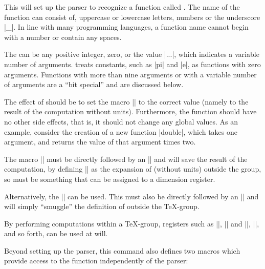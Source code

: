\begin{command}{\pgfmathdeclarefunction{}}

  This will set up the parser to recognize a function called
  . The name of the function can consist of, uppercase or
  lowercase letters, numbers or the underscore |_|. In line with
  many programming languages, a function name cannot begin with a
  number or contain any spaces.

  The  can be any positive integer, zero,
  or the value |...|, which indicates a variable number of
  arguments. \pgfname{} treats constants, such as |pi| and |e|, as
  functions with zero arguments. Functions with more than nine
  arguments or with a variable number of arguments are a ``bit special'' and
  are discussed below.

  The effect of  should be to set the macro
  |\pgfmathresult| to the correct value (namely to the result of the
  computation without units).  Furthermore, the function should have
  no other side effects, that is, it should not change any global
  values. As an example, consider the creation of a new function
  |double|, which takes one argument, and returns the value of that
  argument times two.

\begin{codeexample}[]
\makeatletter
{}
\makeatother
{}\pgfmathresult
\end{codeexample}

  The macro |\pgfmathreturn| must be
  directly followed by an |\endgroup| and will save the result of the
  computation, by defining |\pgfmathresult| as the expansion of
   (without units) outside the group, so 
  must be something that can be assigned to a dimension register.

  Alternatively, the |\pgfmathsmuggle| can be used. This
  must also be directly followed by an |\endgroup| and will simply
  ``smuggle'' the definition of  outside the \TeX-group.

	By performing computations within a \TeX-group, \pgfname{}
	registers such as |\pgf@x|, |\pgf@y| and |\c@pgf@counta|,
	|\c@pgfcountb|, and so forth, can be used at will.

  Beyond setting up the parser, this command also defines two macros
  which provide access to the function independently of the parser:


\end{command}
